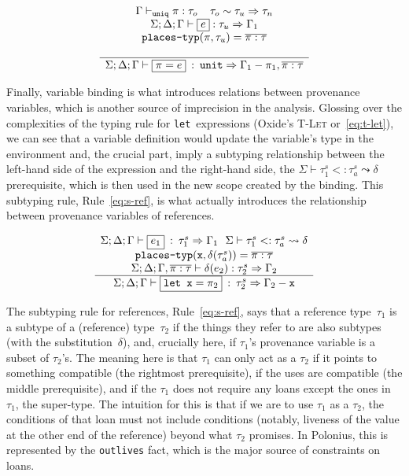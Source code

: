 \documentclass[11pt,a4paper,twoside,openany]{report}
\newcommand{\InRust}[1]{\texttt{#1}}
\newcommand{\InDatalog}[1]{\texttt{#1}}
\newcommand{\expression}[1]{\boxed{#1}}
\newcommand{\ntyperule}[2]{\begin{array}{c}#1\\\hline\raisebox{1pt}{\strut}#2\end{array}}
\begin{document}
\begin{equation}\label{eq:t-assignment}
  \ntyperule{
    \Gamma \vdash_{\texttt{uniq}} \pi : \tau_o \:\:\:\:\:
    \tau_o \sim \tau_u \Rightarrow \tau_n \\
    \Sigma ; \Delta ; \Gamma \vdash \expression{e} : \tau_u \Rightarrow \Gamma_1 \\
    \texttt{places-typ}(\pi, \tau_u) = \overline{\pi : \tau} \\
  }
  {
    \Sigma ; \Delta ; \Gamma \vdash \expression{\pi = e} \: : \: \texttt{unit} \Rightarrow \Gamma_1 - \pi_1, \overline{\pi : \tau}
  }
\end{equation}

Finally, variable binding is what introduces relations between provenance
variables, which is another source of imprecision in the analysis. Glossing over
the complexities of the typing rule for \InRust{let}~expressions (Oxide's
\textsc{T-Let} or~\eqref{eq:t-let}), we can see that a variable definition would
update the variable's type in the environment and, the crucial part, imply a
subtyping relationship between the left-hand side of the expression and the
right-hand side, the $\Sigma \vdash \tau_1 ^s <: \tau_a^s \leadsto \delta$
prerequisite, which is then used in the new scope created by the binding. This
subtyping rule, Rule~\eqref{eq:s-ref}, is what actually introduces the
relationship between provenance variables of references.

\begin{equation}\label{eq:t-let}
  \ntyperule{
    \Sigma ; \Delta ; \Gamma \vdash \expression{e_1} \: : \: \tau_1^s \Rightarrow \Gamma_1
    \:\:\: \Sigma \vdash \tau_1 ^s <: \tau_a^s \leadsto \delta \\
    \texttt{places-typ}(\mathtt{x}, \delta(\tau^s_a)) = \overline{\pi : \tau} \\
    \Sigma ; \Delta ; \Gamma, \overline{\pi : \tau} \vdash \delta(e_2) : \tau_2^s \Rightarrow \Gamma_2
  }
  {\Sigma ; \Delta ; \Gamma \vdash \expression{\texttt{let } \mathtt{x} = \pi_2} \: : \: \tau_2^s \Rightarrow \Gamma_2 - \mathtt{x}}
\end{equation}

The subtyping rule for references, Rule~\eqref{eq:s-ref}, says that a reference
type~$\tau_1$ is a subtype of a (reference) type~$\tau_2$ if the things they
refer to are also subtypes (with the substitution~$\delta$), and, crucially
here, if $\tau_1$'s provenance variable is a subset of $\tau_2$'s. The meaning
here is that $\tau_1$ can only act as a $\tau_2$ if it points to something
compatible (the rightmost prerequisite), if the uses are compatible (the middle
prerequisite), and if the $\tau_1$ does not require any loans except the ones in
$\tau_1$, the super-type. The intuition for this is that if we are to use
$\tau_1$ as a $\tau_2$, the conditions of that loan must not include conditions
(notably, liveness of the value at the other end of the reference) beyond what
$\tau_2$ promises. In Polonius, this is represented by the \InDatalog{outlives}
fact, which is the major source of constraints on loans.
\end{document}
